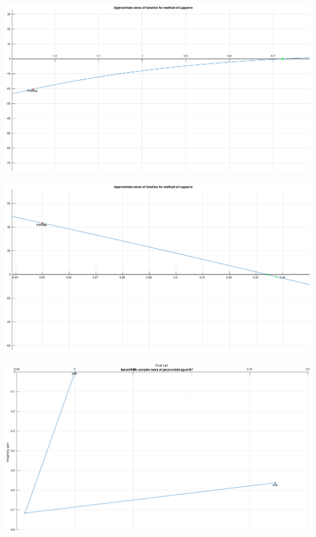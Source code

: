 \documentclass[12pt]{report}
\begin{document}
\begin{center}
   \includegraphics[scale=0.25]{task3left.eps}
\end{center}

\begin{center}
   \includegraphics[scale=0.25]{task3right.eps}
\end{center}

\begin{center}
   \includegraphics[scale=0.25]{task3complexoverall.eps}
\end{center}
\end{document}
